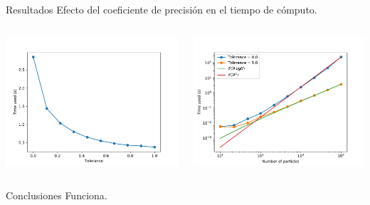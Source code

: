 \documentclass[handout]{beamer}
\begin{document}
\begin{frame}{Resultados}
	Efecto del coeficiente de precisi\'on en el tiempo de c\'omputo.
	\begin{columns}
		\begin{column}{0.5\textwidth}
			\includegraphics[width=\linewidth]{sources/images/Tolerance_results.pdf}
		\end{column}
		\begin{column}{0.5\textwidth}
			\includegraphics[width=\linewidth]{sources/images/Particles_results.pdf}
		\end{column}
	\end{columns}
\end{frame}
\begin{frame}{Conclusiones}
	Funciona.
\end{frame}
\end{document}
